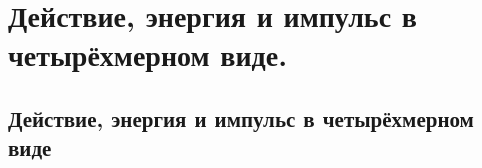 \chapter{Действие, энергия и импульс в четырёхмерном виде.}

\section{Действие, энергия и импульс в четырёхмерном виде}
